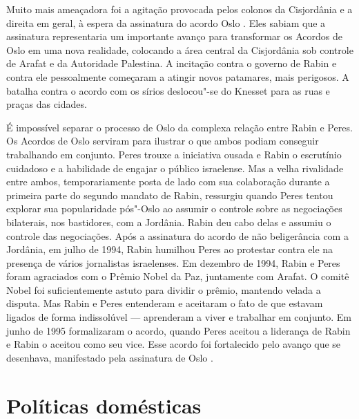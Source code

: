 Muito mais ameaçadora foi a agitação provocada pelos colonos da
Cisjordânia e a direita em geral, à espera da assinatura do acordo Oslo
. Eles sabiam que a assinatura representaria um importante avanço para
transformar os Acordos de Oslo em uma nova realidade, colocando a área
central da Cisjordânia sob controle de Arafat e da Autoridade Palestina.
A incitação contra o governo de Rabin e contra ele pessoalmente
começaram a atingir novos patamares, mais perigosos. A batalha contra o
acordo com os sírios deslocou"-se do Knesset para as ruas e praças das
cidades.

É impossível separar o processo de Oslo da complexa relação entre Rabin
e Peres. Os Acordos de Oslo serviram para ilustrar o que ambos podiam
conseguir trabalhando em conjunto. Peres trouxe a iniciativa ousada e
Rabin o escrutínio cuidadoso e a habilidade de engajar o público
israelense. Mas a velha rivalidade entre ambos, temporariamente
posta de lado com sua colaboração durante a primeira parte do segundo
mandato de Rabin, ressurgiu quando Peres tentou explorar sua
popularidade pós"-Oslo ao assumir o controle sobre as negociações
bilaterais, nos bastidores, com a Jordânia. Rabin deu cabo delas e
assumiu o controle das negociações. Após a assinatura do acordo de
não beligerância com a Jordânia, em julho de 1994, Rabin humilhou Peres
ao protestar contra ele na presença de vários jornalistas israelenses.
Em dezembro de 1994, Rabin e Peres foram agraciados com o Prêmio Nobel da
Paz, juntamente com Arafat. O comitê Nobel foi suficientemente astuto
para dividir o prêmio, mantendo velada a disputa. Mas Rabin e Peres
entenderam e aceitaram o fato de que estavam ligados de forma
indissolúvel --- aprenderam a viver e trabalhar em conjunto. Em junho de
1995 formalizaram o acordo, quando Peres aceitou a liderança de Rabin e
Rabin o aceitou como seu vice. Esse acordo foi fortalecido pelo avanço
que se desenhava, manifestado pela assinatura de Oslo .

\section{Políticas domésticas}

